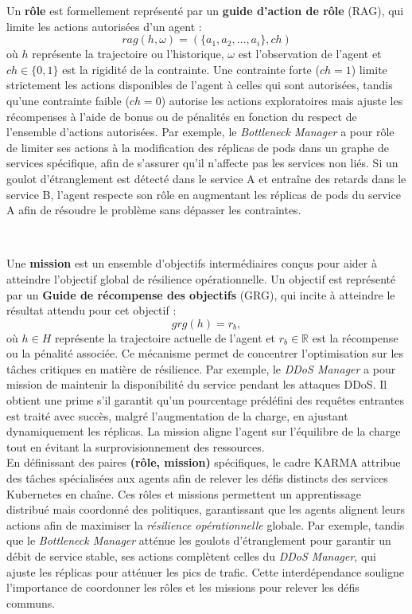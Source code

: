 Un \textbf{rôle} est formellement représenté par un \textbf{guide d'action de rôle} (RAG), qui limite les actions autorisées d'un agent :
$$
rag(h, \omega) = (\{a_1, a_2, \dots, a_i\}, ch)
$$
où $h$ représente la trajectoire ou l'historique, \(\omega\) est l'observation de l'agent et \(ch \in \{0,1\}\) est la rigidité de la contrainte. Une contrainte forte (\(ch = 1\)) limite strictement les actions disponibles de l'agent à celles qui sont autorisées, tandis qu'une contrainte faible (\(ch = 0\)) autorise les actions exploratoires mais ajuste les récompenses à l'aide de bonus ou de pénalités en fonction du respect de l'ensemble d'actions autorisées. Par exemple, le \textit{Bottleneck Manager} a pour rôle de limiter ses actions à la modification des réplicas de pods dans un graphe de services spécifique, afin de s'assurer qu'il n'affecte pas les services non liés. Si un goulot d'étranglement est détecté dans le service A et entraîne des retards dans le service B, l'agent respecte son rôle en augmentant les réplicas de pods du service A afin de résoudre le problème sans dépasser les contraintes.

\

Une \textbf{mission} est un ensemble d'objectifs intermédiaires conçus pour aider à atteindre l'objectif global de résilience opérationnelle. Un objectif est représenté par un \textbf{Guide de récompense des objectifs} (GRG), qui incite à atteindre le résultat attendu pour cet objectif :
$$
grg(h) = r_b,
$$
où \(h \in H\) représente la trajectoire actuelle de l'agent et \(r_b \in \mathbb{R}\) est la récompense ou la pénalité associée. Ce mécanisme permet de concentrer l'optimisation sur les tâches critiques en matière de résilience. Par exemple, le \textit{DDoS Manager} a pour mission de maintenir la disponibilité du service pendant les attaques DDoS. Il obtient une prime s'il garantit qu'un pourcentage prédéfini des requêtes entrantes est traité avec succès, malgré l'augmentation de la charge, en ajustant dynamiquement les réplicas. La mission aligne l'agent sur l'équilibre de la charge tout en évitant la surprovisionnement des ressources.\\

En définissant des paires \textbf{(rôle, mission)} spécifiques, le cadre KARMA attribue des tâches spécialisées aux agents afin de relever les défis distincts des services Kubernetes en chaîne. Ces rôles et missions permettent un apprentissage distribué mais coordonné des politiques, garantissant que les agents alignent leurs actions afin de maximiser la \textit{résilience opérationnelle} globale. Par exemple, tandis que le \textit{Bottleneck Manager} atténue les goulots d'étranglement pour garantir un débit de service stable, ses actions complètent celles du \textit{DDoS Manager}, qui ajuste les réplicas pour atténuer les pics de trafic. Cette interdépendance souligne l'importance de coordonner les rôles et les missions pour relever les défis communs.

